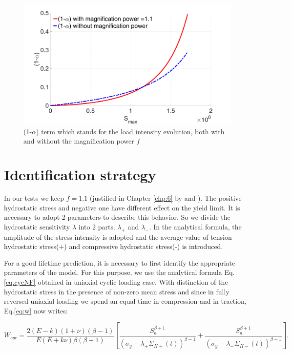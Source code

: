 \begin{figure}[!h]
\centering
\includegraphics[width=\textwidth]{figures//alp_Smax_fb.png} 
\caption{(1-$\alpha$) term which stands for the load intensity evolution, both with and without the magnification power $f$}
\label{fig.SmaxSequence}
\end{figure}

\clearpage
\section{Identification strategy}
\label{sec:5.9}
In our tests we keep $f=1.1$ (justified in Chapter \ref{chp:6} by  and ). The positive hydrostatic stress and negative one have different effect on the yield limit. It is necessary to adopt 2 parameters to describe this behavior. So we divide the hydrostatic sensitivity $\lambda$ into 2 parts. $\lambda_+$ and $\lambda_-$. In the analytical formula, the amplitude of the stress intensity is adopted and the average value of tension hydrostatic stress(+) and compressive hydrostatic stress(-) is introduced.

For a good lifetime prediction, it is necessary to first identify the appropriate parameters of the model. For this purpose, we use the analytical formula Eq.\eqref{eq.cycNF} obtained in uniaxial cyclic loading case. With distinction of the hydrostatic stress in the presence of non-zero mean stress and since in fully reversed uniaxial loading we spend an equal time in compression and in traction, Eq.\eqref{eq:w} now writes:

\begin{equation}
W_{cyc}=\dfrac{2(E-k)(1+\nu)\left( \beta-1\right) }{ E(E+k\nu)\beta\left( \beta+1\right) }\left[ \dfrac{S_{a}^{\beta+1}}{ \left(\sigma_y-\lambda_+ \overline{\Sigma}_{H+}(t)\right)^{\beta-1}}+\dfrac{S_{a}^{\beta+1}}{ \left(\sigma_y-\lambda_- \overline{\Sigma}_{H-}(t)\right)^{\beta-1}}\right] .
\label{eq:wcycnew}
\end{equation}

